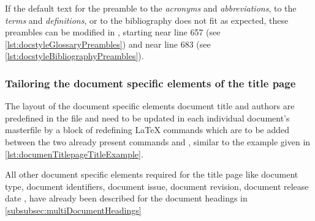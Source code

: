 
If the default text for the preamble to the \emph{acronyms} and
\emph{abbreviations}, to the \emph{terms} and \emph{definitions}, or to the
bibliography does not fit as expected, these preambles can be modified in
, starting near line 657 (see
\autoref{lst:docstyleGlossaryPreambles}) and near line 683 (see
\autoref{lst:docstyleBibliographyPreambles}).






\subsubsection[Title page specific elements]{Tailoring the document specific elements of the title page}
\label{subsubsec:multiDocumentTitlePageSpecifics}

The layout of the document specific elements document title and authors are
predefined in the file  and need to be updated in each
individual document's masterfile by a block of redefining \LaTeX{} commands
which are to be added between the two already present commands
\latexcmd{\makeatletter} and \latexcmd{\makeatother}, similar to the
example given in \autoref{lst:documenTitlepageTitleExample}.

All other document specific elements required for the title page like
document type, document identifiers, document issue, document revision,
document release date \ETC{}, have already been described for the document
headings in \autoref{subsubsec:multiDocumentHeadings}


